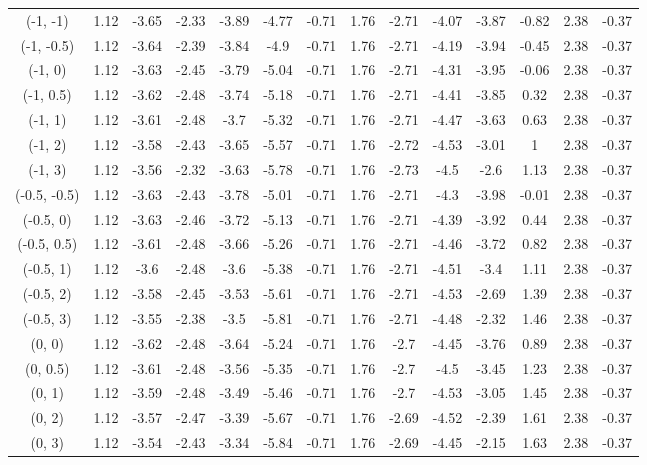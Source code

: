 \documentclass[11pt,a4paper,twoside,openany]{book}\usepackage{knitr}
\begin{document}
{{\begin{knitrout}
\begin{landscape}
\begin{longtable}[t]{cccccccccccccc}
(-1, -1) & 1.12 & -3.65 & -2.33 & -3.89 & -4.77 & -0.71 & 1.76 & -2.71 & -4.07 & -3.87 & -0.82 & 2.38 & -0.37\\
(-1, -0.5) & 1.12 & -3.64 & -2.39 & -3.84 & -4.9 & -0.71 & 1.76 & -2.71 & -4.19 & -3.94 & -0.45 & 2.38 & -0.37\\
(-1, 0) & 1.12 & -3.63 & -2.45 & -3.79 & -5.04 & -0.71 & 1.76 & -2.71 & -4.31 & -3.95 & -0.06 & 2.38 & -0.37\\
(-1, 0.5) & 1.12 & -3.62 & -2.48 & -3.74 & -5.18 & -0.71 & 1.76 & -2.71 & -4.41 & -3.85 & 0.32 & 2.38 & -0.37\\
(-1, 1) & 1.12 & -3.61 & -2.48 & -3.7 & -5.32 & -0.71 & 1.76 & -2.71 & -4.47 & -3.63 & 0.63 & 2.38 & -0.37\\
(-1, 2) & 1.12 & -3.58 & -2.43 & -3.65 & -5.57 & -0.71 & 1.76 & -2.72 & -4.53 & -3.01 & 1 & 2.38 & -0.37\\
(-1, 3) & 1.12 & -3.56 & -2.32 & -3.63 & -5.78 & -0.71 & 1.76 & -2.73 & -4.5 & -2.6 & 1.13 & 2.38 & -0.37\\
(-0.5, -0.5) & 1.12 & -3.63 & -2.43 & -3.78 & -5.01 & -0.71 & 1.76 & -2.71 & -4.3 & -3.98 & -0.01 & 2.38 & -0.37\\
(-0.5, 0) & 1.12 & -3.63 & -2.46 & -3.72 & -5.13 & -0.71 & 1.76 & -2.71 & -4.39 & -3.92 & 0.44 & 2.38 & -0.37\\
(-0.5, 0.5) & 1.12 & -3.61 & -2.48 & -3.66 & -5.26 & -0.71 & 1.76 & -2.71 & -4.46 & -3.72 & 0.82 & 2.38 & -0.37\\
(-0.5, 1) & 1.12 & -3.6 & -2.48 & -3.6 & -5.38 & -0.71 & 1.76 & -2.71 & -4.51 & -3.4 & 1.11 & 2.38 & -0.37\\
(-0.5, 2) & 1.12 & -3.58 & -2.45 & -3.53 & -5.61 & -0.71 & 1.76 & -2.71 & -4.53 & -2.69 & 1.39 & 2.38 & -0.37\\
(-0.5, 3) & 1.12 & -3.55 & -2.38 & -3.5 & -5.81 & -0.71 & 1.76 & -2.71 & -4.48 & -2.32 & 1.46 & 2.38 & -0.37\\
(0, 0) & 1.12 & -3.62 & -2.48 & -3.64 & -5.24 & -0.71 & 1.76 & -2.7 & -4.45 & -3.76 & 0.89 & 2.38 & -0.37\\
(0, 0.5) & 1.12 & -3.61 & -2.48 & -3.56 & -5.35 & -0.71 & 1.76 & -2.7 & -4.5 & -3.45 & 1.23 & 2.38 & -0.37\\
(0, 1) & 1.12 & -3.59 & -2.48 & -3.49 & -5.46 & -0.71 & 1.76 & -2.7 & -4.53 & -3.05 & 1.45 & 2.38 & -0.37\\
(0, 2) & 1.12 & -3.57 & -2.47 & -3.39 & -5.67 & -0.71 & 1.76 & -2.69 & -4.52 & -2.39 & 1.61 & 2.38 & -0.37\\
(0, 3) & 1.12 & -3.54 & -2.43 & -3.34 & -5.84 & -0.71 & 1.76 & -2.69 & -4.45 & -2.15 & 1.63 & 2.38 & -0.37\\

\end{longtable}
\end{landscape}
\end{knitrout}}}
\end{document}

